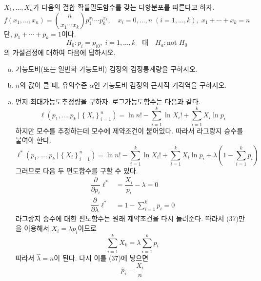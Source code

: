 \documentclass[answers]{exam}
\begin{document}
\begin{questions}
\begin{solution}
   \end{solution}
   \question
   $X_{1},\ldots,X_{n}$가 다음의 결합 확률밀도함수를 갖는 다항분포를 따른다고 하자.
   $$
    f\left(x_{1},\ldots,x_{n}\right) = {{n}\choose{x_{1}\cdots x_{k}}}p_{1}^{x_{1}}\cdots p_{k}^{x_{k}},\quad x_{i}=0,\ldots, n\;\left(i=1,\ldots,k\right),\;x_{1}+\cdots+x_{k}=n
   $$
   단, $p_{1}+\cdots+p_{k}=1$이다.
   $$
    H_{0}:p_{i}=p_{i0},\; i=1,\ldots,k \quad \text{대} \quad H_{a}:\text{not $H_{0}$}
   $$
   의 가설검정에 대하여 다음에 답하시오.
   \begin{enumerate}[(a)]
    \item 가능도비(또는 일반화 가능도비) 검정의 검정통계량을 구하시오.
    \item $n$의 값이 클 때, 유의수준 $\alpha$인 가능도비 검정의 근사적 기각역을 구하시오.
   \end{enumerate}
   \begin{solution}
    \begin{enumerate}[(a)]
      \item 먼저 최대가능도추정량을 구하자. 로그가능도함수는 다음과 같다.
      \begin{equation}
        \ell\left(p_{1},\ldots,p_{k}\,|\,\left\{X_{i}\right\}_{i=1}^{n}\right)=\ln n!-\sum_{i=1}^{k}\ln X_{i}!+\sum_{i=1}^{k}X_{i}\ln p_{i}
      \end{equation}
      하지만 모수를 추정하는데 모수에 제약조건이 붙어있다. 따라서 라그랑지 승수를 붙여야 한다.
      \begin{equation}
        \ell^{*}\left(p_{1},\ldots,p_{k}\,|\,\left\{X_{i}\right\}_{i=1}^{n}\right)=\ln n!-\sum_{i=1}^{k}\ln X_{i}!+\sum_{i=1}^{k}X_{i}\ln p_{i}+\lambda\left(1-\sum_{i=1}^{k}p_{i}\right)
      \end{equation}
      그러므로 다음 두 편도함수를 구할 수 있다.
      \begin{align}
        \dfrac{\partial}{\partial p_{i}}\ell^{*} &= \dfrac{X_{i}}{p_{i}}-\lambda=0\\
        \dfrac{\partial}{\partial \lambda}\ell^{*} &= 1-\sum_{i=1}^{k}p_{i}=0
      \end{align}
      라그랑지 승수에 대한 편도함수는 원래 제약조건을 다시 돌려준다. 따라서 (37)만을 이용해서 $X_{i}=\lambda p_{i}$이므로
      \begin{equation}
        \sum_{i=1}^{k}X_{k} = \lambda \sum_{i=1}^{k}p_{i}
      \end{equation}
      따라서 $\widehat{\lambda}=n$이 된다. 다시 이를 (37)에 넣으면
      \begin{equation}
        \hat{p}_{i} = \dfrac{X_{i}}{n}

\end{equation}
\end{enumerate}
\end{solution}
\end{questions}
\end{document}

